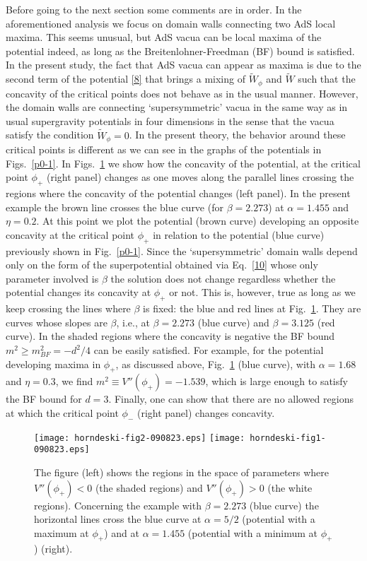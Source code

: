 \documentclass[aps,12pt, a4paper,nofootinbib]{revtex4}
\begin{document}
{Before going to the next section some comments are in order. In the aforementioned analysis we focus on domain walls connecting two AdS local maxima. This seems unusual, but AdS vacua can be local maxima of the potential indeed, as long as the Breitenlohner-Freedman (BF) bound is satisfied. In the present study, the fact that AdS vacua can appear as maxima is due to the second term of the potential \eqref{8} that brings a mixing of $\tilde{W}_\phi$ and $\tilde{W}$ such that the concavity of the critical points does not behave as in the usual manner. 
However, the domain walls are connecting `supersymmetric' vacua in the same way as in usual supergravity potentials in four dimensions \cite{Cvetic:1996vr,Cvetic:1993xe,Cvetic:1992st,Skenderis:2006jq} in the sense that the vacua satisfy the condition $\tilde{W}_\phi=0$. In the present theory, the behavior around these critical points is different as we can see in the graphs of the potentials in Figs.~\ref{p0-1}.  In Figs.~\ref{alpha-eta} we show how the concavity of the potential, at the critical point $\phi_+$ (right panel) changes as one moves along the parallel lines crossing the regions where the concavity of the potential changes (left panel). In the present example the brown line crosses the blue curve (for $\beta=2.273$) at $\alpha=1.455$ and $\eta=0.2$. At this point we plot the potential (brown curve) developing an opposite concavity at the critical point $\phi_+$ in relation to the potential (blue curve) previously shown in Fig.~\ref{p0-1}. Since the `supersymmetric' domain walls depend only on the form of the superpotential obtained via Eq.~\eqref{10} whose only parameter involved is $\beta$ the solution does not change regardless whether the potential changes its concavity at $\phi_+$ or not. This is, however, true as long as we keep crossing the lines where $\beta$ is fixed: the blue and red lines at Fig.~\ref{alpha-eta}. They are curves whose slopes are $\beta$, i.e., at  $\beta=2.273$ (blue curve) and  $\beta=3.125$ (red curve). In the shaded regions where the concavity is negative the BF bound $m^2\geq m_{BF}^2=-d^2/4$ can be easily satisfied. For example, for the potential developing maxima in $\phi_+$, as discussed above, Fig.~\ref{alpha-eta} (blue curve), with $\alpha=1.68$ and $\eta=0.3$, we find $m^2\equiv V''(\phi_+)=-1.539$, which is large enough to satisfy the BF bound for $d=3$. Finally, one can show that there are no allowed regions at which the critical point $\phi_-$ (right panel) changes concavity.
\begin{figure}[!ht]
\begin{center}
\texttt{[image: horndeski-fig2-090823.eps]}\qquad\qquad\qquad
\texttt{[image: horndeski-fig1-090823.eps]}
\caption{The figure (left) shows the regions in the space of parameters where $V''(\phi_+)<0$ (the shaded regions) and $V''(\phi_+)>0$ (the white regions). Concerning the example with $\beta=2.273$  (blue curve) the horizontal lines cross the blue curve at $\alpha=5/2$ (potential with a maximum at $\phi_+$) and at $\alpha=1.455$   (potential with a minimum at $\phi_+$) (right).}
\label{alpha-eta}
\end{center}
\end{figure}

}
\end{document}
